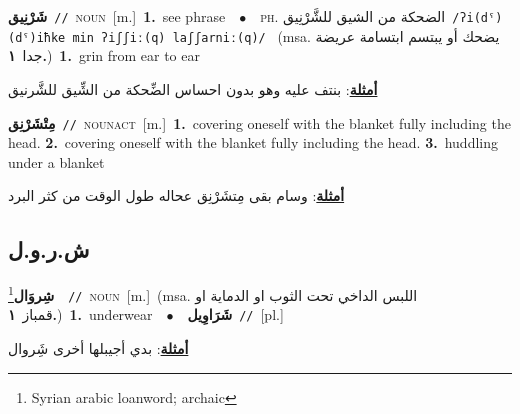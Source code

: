 \documentclass[10pt,a4paper,twoside]{article} %
\begin{document}
\begin{multicols}{2}
{\setlength\topsep{0pt}\textbf{\foreignlanguage{arabic}{شَرْنِيق}}\ {\color{gray}\texttt{//}\color{black}}\ \textsc{noun}\ [m.]\ \textbf{1.}~see phrase\ \ $\bullet$\ \ \textsc{ph.} \color{gray} \foreignlanguage{arabic}{الضحكة من الشيق للشَّرْنِيق}\color{black}\ {\color{gray}\texttt{/{\sffamily ʔi(dˤ)(dˤ)iħke min ʔiʃʃiː(q) laʃʃarniː(q)}/}\color{black}}\ \color{gray} (msa. \foreignlanguage{arabic}{يضحك أو يبتسم ابتسامة عريضة جدا}~\foreignlanguage{arabic}{\textbf{١.}})\color{black}\ \textbf{1.}~grin from ear to ear\  \begin{flushright}\color{gray}\foreignlanguage{arabic}{\textbf{\underline{\foreignlanguage{arabic}{أمثلة}}}: بنتف عليه وهو بدون احساس الضِّحكة من الشِّيق للشَّرنيق}\end{flushright}\color{black}} \vspace{2mm}

{\setlength\topsep{0pt}\textbf{\foreignlanguage{arabic}{مِتْشَرْنِق}}\ {\color{gray}\texttt{//}\color{black}}\ \textsc{noun\textunderscore act}\ [m.]\ \textbf{1.}~covering oneself with the blanket fully including the head.  \textbf{2.}~covering oneself with the blanket fully including the head.  \textbf{3.}~huddling under a blanket\  \begin{flushright}\color{gray}\foreignlanguage{arabic}{\textbf{\underline{\foreignlanguage{arabic}{أمثلة}}}: وسام بقى مِتشَرْنِق عحاله طول الوقت من كثر البرد}\end{flushright}\color{black}} \vspace{2mm}

\vspace{-3mm}
\subsection*{\color{blue}\foreignlanguage{arabic}{ش.ر.و.ل}\color{blue}{}} 

{\setlength\topsep{0pt}\textbf{\foreignlanguage{arabic}{شِروَال}}\footnote{Syrian arabic loanword; archaic}\ \ {\color{gray}\texttt{//}\color{black}}\ \textsc{noun}\ [m.]\ \color{gray}(msa. \foreignlanguage{arabic}{اللبس الداخي تحت الثوب او الدماية او قمباز}~\foreignlanguage{arabic}{\textbf{١.}})\color{black}\ \textbf{1.}~underwear\ \ $\bullet$\ \ \setlength\topsep{0pt}\textbf{\foreignlanguage{arabic}{شَرَاوِيل}}\ {\color{gray}\texttt{//}\color{black}}\ [pl.]\  \begin{flushright}\color{gray}\foreignlanguage{arabic}{\textbf{\underline{\foreignlanguage{arabic}{أمثلة}}}: بدي أجيبلها أخرى شَِروال}\end{flushright}\color{black}} \vspace{2mm}


\end{multicols}
\end{document}
